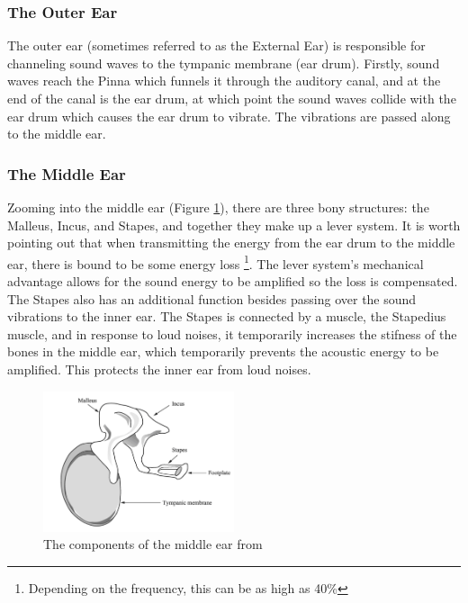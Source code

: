 \documentclass[logo,bsc,singlespacing,parskip,online]{infthesis}
\begin{document}
\subsubsection{The Outer Ear}
The outer ear (sometimes referred to as the External Ear) is responsible for channeling sound waves to the tympanic membrane (ear drum). Firstly,
sound waves reach the Pinna which funnels it through the auditory canal, and at the end of the canal 
is the ear drum, at which point the sound waves collide with the ear drum which causes the ear drum to vibrate. 
The vibrations are passed along to the middle ear.

\subsubsection{The Middle Ear}
Zooming into the middle ear (Figure \ref{fig:middle-ear}), there are three bony structures: the Malleus, Incus, and Stapes,
and together they make up a lever system. 
It is worth pointing out that when transmitting the energy from the ear drum to the middle ear, there is bound to be some energy 
loss \footnote{Depending on the frequency, this can be as high as 40\%}. The lever system's mechanical advantage 
allows for the sound energy to be amplified so the loss is compensated. 
The Stapes also has an additional function besides passing over the sound vibrations to the inner ear. The Stapes 
is connected by a muscle, the Stapedius muscle, and in response to loud noises, it temporarily increases the stifness
of the bones in the middle ear, which temporarily prevents the acoustic energy to be amplified. This 
protects the inner ear from loud noises.

\begin{figure}[h]
   \centering
   \includegraphics[width=0.5\textwidth]{wayland-middle-ear.png}
   \caption{The components of the middle ear from \citet{Wayland2018Phonetics}}
   \label{fig:middle-ear}
\end{figure}
\end{document}
